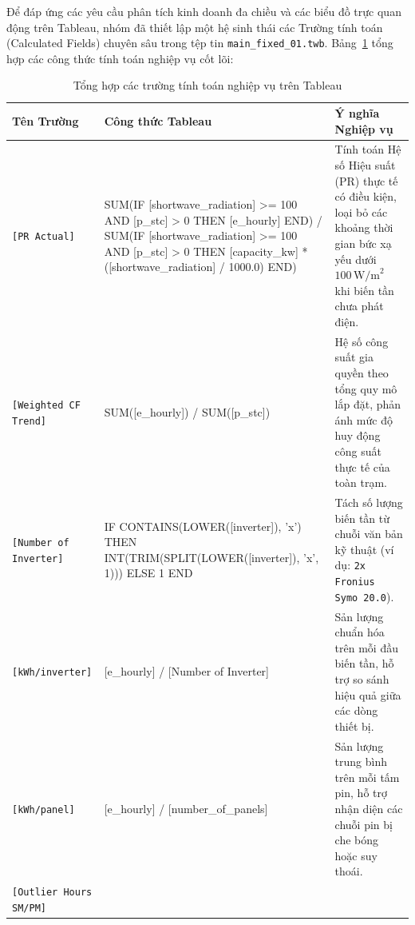\documentclass[12pt, a4paper]{report}
\begin{document}
Để đáp ứng các yêu cầu phân tích kinh doanh đa chiều và các biểu đồ trực quan động trên Tableau, nhóm đã thiết lập một hệ sinh thái các Trường tính toán (Calculated Fields) chuyên sâu trong tệp tin \texttt{main\_fixed\_01.twb}. Bảng~\ref{tab:tableau_calculated_fields} tổng hợp các công thức tính toán nghiệp vụ cốt lõi:

\begin{table}[H]
\centering
\caption{Tổng hợp các trường tính toán nghiệp vụ trên Tableau}
\label{tab:tableau_calculated_fields}
\small
\renewcommand{\arraystretch}{1.25}
\begin{tabularx}{\textwidth}{@{} >{\raggedright\arraybackslash}p{3.2cm} >{\raggedright\arraybackslash\ttfamily\scriptsize}p{6.0cm} >{\raggedright\arraybackslash}X @{}}
\toprule
\textbf{Tên Trường} & \textbf{Công thức Tableau} & \textbf{Ý nghĩa Nghiệp vụ} \\
\midrule
\texttt{[PR Actual]} & 
SUM(IF [shortwave\_radiation] >= 100 \newline
\quad AND [p\_stc] > 0 THEN [e\_hourly] END) \newline
/ SUM(IF [shortwave\_radiation] >= 100 \newline
\quad AND [p\_stc] > 0 \newline
\quad THEN [capacity\_kw] * ([shortwave\_radiation] / 1000.0) END) & 
Tính toán Hệ số Hiệu suất (PR) thực tế có điều kiện, loại bỏ các khoảng thời gian bức xạ yếu dưới $100\,\text{W/m}^2$ khi biến tần chưa phát điện. \\
\midrule
\texttt{[Weighted CF Trend]} & 
SUM([e\_hourly]) / SUM([p\_stc]) & 
Hệ số công suất gia quyền theo tổng quy mô lắp đặt, phản ánh mức độ huy động công suất thực tế của toàn trạm. \\
\midrule
\texttt{[Number of Inverter]} & 
IF CONTAINS(LOWER([inverter]), 'x') \newline
THEN INT(TRIM(SPLIT(LOWER([inverter]), 'x', 1))) \newline
ELSE 1 END & 
Tách số lượng biến tần từ chuỗi văn bản kỹ thuật (ví dụ: \texttt{2x Fronius Symo 20.0}). \\
\midrule
\texttt{[kWh/inverter]} & 
[e\_hourly] / [Number of Inverter] & 
Sản lượng chuẩn hóa trên mỗi đầu biến tần, hỗ trợ so sánh hiệu quả giữa các dòng thiết bị. \\
\midrule
\texttt{[kWh/panel]} & 
[e\_hourly] / [number\_of\_panels] & 
Sản lượng trung bình trên mỗi tấm pin, hỗ trợ nhận diện các chuỗi pin bị che bóng hoặc suy thoái. \\
\midrule
\texttt{[Outlier Hours SM/PM]} & 

\end{tabularx}
\end{table}
\end{document}

